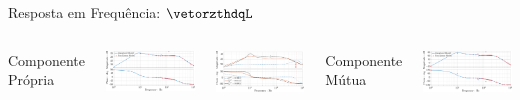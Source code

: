 \begin{frame}{Resposta em Frequência: $\vetorzthdqL$}

\begin{columns}

\centering

Componente Própria

\includegraphics[width=0.88\linewidth]{./figuras/figuras_srf/bode_Z_th_dd}

\includegraphics[width=0.88\linewidth]{./figuras/figuras_var_gain/bode_Zth_vdl_srf_dd_var_kpv}


\centering


Componente Mútua

\includegraphics[width=0.88\linewidth]{./figuras/figuras_srf/bode_Z_th_dq}


\end{columns}
\end{frame}

